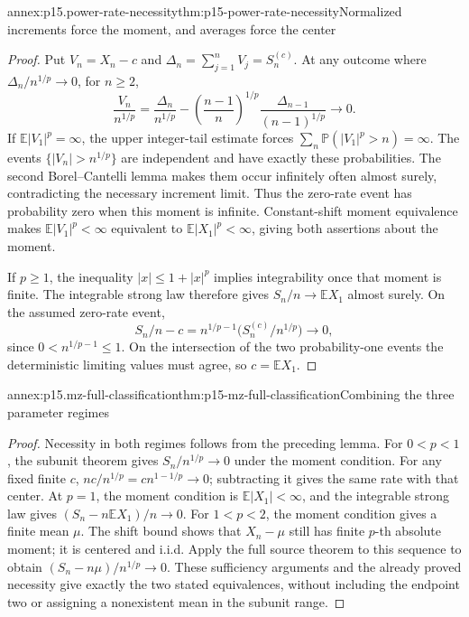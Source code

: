 \begin{annexitem}{annex:p15.power-rate-necessity}{thm:p15-power-rate-necessity}{Normalized increments force the moment, and averages force the center}
\begin{proof}
Put \(V_n=X_n-c\) and \(\Delta_n=\sum_{j=1}^nV_j=S_n^{(c)}\).
At any outcome where \(\Delta_n/n^{1/p}\to0\), for \(n\geq2\),
\[
 \frac{V_n}{n^{1/p}}
  =\frac{\Delta_n}{n^{1/p}}
       -\left(\frac{n-1}{n}\right)^{1/p}
                 \frac{\Delta_{n-1}}{(n-1)^{1/p}}
                         \longrightarrow0.
\]
If \(\mathbb E|V_1|^p=\infty\), the upper integer-tail estimate
forces \(\sum_n\mathbb P(|V_1|^p>n)=\infty\).
The events \(\{|V_n|>n^{1/p}\}\) are independent and have exactly
these probabilities. The second Borel--Cantelli lemma makes them
occur infinitely often almost surely, contradicting the necessary
increment limit. Thus the zero-rate event has probability zero when
this moment is infinite. Constant-shift moment equivalence makes
\(\mathbb E|V_1|^p<\infty\) equivalent to
\(\mathbb E|X_1|^p<\infty\), giving both assertions about the moment.

If \(p\geq1\), the inequality \(|x|\leq1+|x|^p\) implies
integrability once that moment is finite. The integrable strong law
therefore gives \(S_n/n\to\mathbb EX_1\) almost surely.
On the assumed zero-rate event,
\[
 S_n/n-c=n^{1/p-1}\bigl(S_n^{(c)}/n^{1/p}\bigr)\longrightarrow0,
\]
since \(0<n^{1/p-1}\leq1\). On the intersection of the two
probability-one events the deterministic limiting values must agree,
so \(c=\mathbb EX_1\).
\end{proof}
\end{annexitem}

\begin{annexitem}{annex:p15.mz-full-classification}{thm:p15-mz-full-classification}{Combining the three parameter regimes}
\begin{proof}
Necessity in both regimes follows from the preceding lemma.
For \(0<p<1\), the subunit theorem gives \(S_n/n^{1/p}\to0\)
under the moment condition. For any fixed finite \(c\),
\(nc/n^{1/p}=c n^{1-1/p}\to0\); subtracting it gives the same
rate with that center.
At \(p=1\), the moment condition is \(\mathbb E|X_1|<\infty\),
and the integrable strong law gives
\((S_n-n\mathbb EX_1)/n\to0\).
For \(1<p<2\), the moment condition gives a finite mean \(\mu\).
The shift bound shows that \(X_n-\mu\) still has finite \(p\)-th
absolute moment; it is centered and i.i.d. Apply the full source
theorem to this sequence to obtain
\((S_n-n\mu)/n^{1/p}\to0\).
These sufficiency arguments and the already proved necessity give
exactly the two stated equivalences, without including the endpoint
two or assigning a nonexistent mean in the subunit range.
\end{proof}
\end{annexitem}

